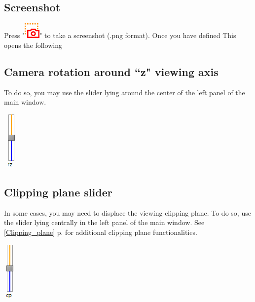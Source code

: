 \subsection{Screenshot}
Press "\includegraphics[scale=0.7]{images/06/camera/screenshot.png}" to take a screenshot (.png format). Once you have defined This opens the following

\subsection{Camera rotation around ``z" viewing axis}

\begin{minipage}{0.7\textwidth}
To do so, you may use the slider lying around the center of the left panel of the main window.
\end{minipage}    
\begin{minipage}{0.25\textwidth}\centering
  \includegraphics[scale=0.7]{images/06/camera/rz_cam.png}
 \end{minipage}    



\subsection{Clipping plane slider}

\begin{minipage}{0.7\textwidth}
In some cases, you may need to displace the viewing clipping plane. To do so, use
the slider lying centrally in the left panel of the main window. See \ref{Clipping_plane} p.\pageref{Clipping_plane} for additional clipping plane functionalities.\\

\end{minipage}    
\begin{minipage}{0.25\textwidth}\centering
  \includegraphics[scale=0.5]{images/06/camera/cp_slider.png}
 \end{minipage}   




